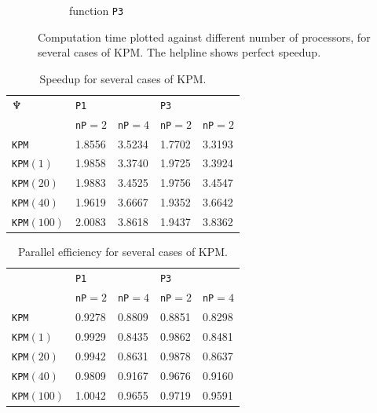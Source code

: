 \begin{figure}[H]
\begin{subfigure}[b]{0.45\textwidth}
                \caption{function \texttt{P3}}
                \label{fig:speed2}
        \end{subfigure}
        \caption{Computation time plotted against different number of processors, for several cases of KPM. The helpline shows perfect speedup.}\label{fig:speed}

\end{figure}

\begin{table}[H]
\centering
\begin{tabular}{l | l l | l l}
$\neptune$ %
 &\texttt{P1} & & \texttt{P3} & \\
&\texttt{nP}$=2$ & \texttt{nP}$=4$ & \texttt{nP}$=2$ & \texttt{nP}$=2$ \\
\hline
\texttt{KPM} & 1.8556  &  3.5234 & 1.7702&    3.3193\\
\texttt{KPM}$(1)$ & 1.9858  &  3.3740 & 1.9725&    3.3924\\
\texttt{KPM}$(20)$ & 1.9883  &  3.4525 & 1.9756&    3.4547\\
\texttt{KPM}$(40)$ & 1.9619  &  3.6667 & 1.9352&   3.6642\\
\texttt{KPM}$(100)$ & 2.0083  &  3.8618 & 1.9437&    3.8362\\
\end{tabular}
\caption{Speedup for several cases of KPM.}
\label{tab:speedup}
\end{table}

\begin{table}[H]
\centering
\begin{tabular}{l | l l | l l}
&\texttt{P1} & & \texttt{P3} & \\
&\texttt{nP}$=2$ & \texttt{nP}$=4$ & \texttt{nP}$=2$ & \texttt{nP}$=4$ \\
\hline
\texttt{KPM} & 0.9278  &  0.8809 & 0.8851&    0.8298\\
\texttt{KPM}$(1)$ &  0.9929  &  0.8435 & 0.9862 &   0.8481\\
\texttt{KPM}$(20)$ & 0.9942  &  0.8631 & 0.9878&    0.8637\\
\texttt{KPM}$(40)$ & 0.9809  &  0.9167 & 0.9676&    0.9160\\
\texttt{KPM}$(100)$ & 1.0042  &  0.9655 & 0.9719&    0.9591\\
\end{tabular}
\caption{Parallel efficiency for several cases of KPM. }
\label{tab:eff}
\end{table}

